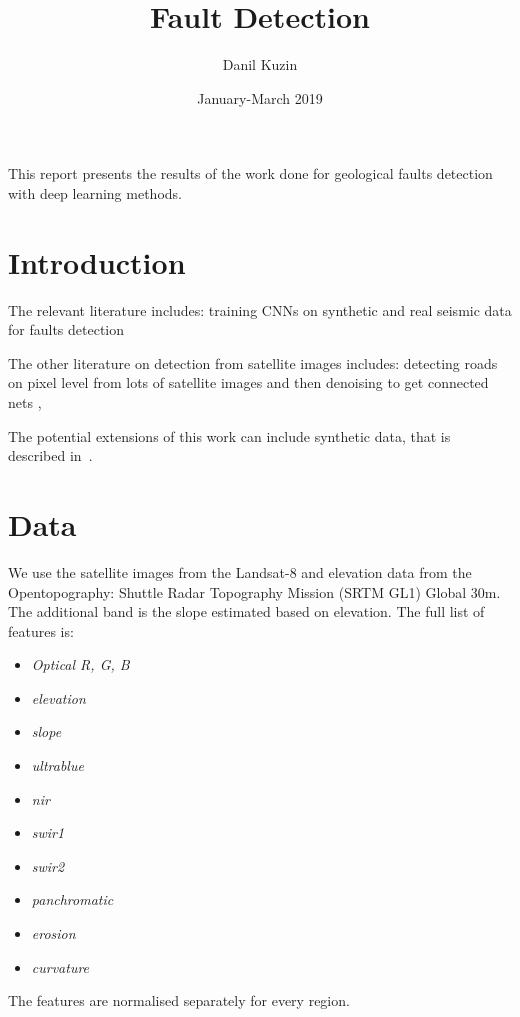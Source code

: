 \documentclass[11pt,a4paper]{article}
\begin{document}
\title{Fault Detection}
\author{Danil Kuzin}
\date{January-March 2019}
\maketitle

\abstract
This report presents the results of the work done for geological faults detection with deep learning methods.



\section{Introduction}

The relevant literature includes: training CNNs on synthetic and real seismic data for faults detection~\cite{pochet2018seismic, araya2017automated, xiong2018seismic, chehrazi2013seismic, lu2018using}

The other literature on detection from satellite images includes: detecting roads on pixel level from lots of satellite images and then denoising to get connected nets \cite{mnih2010learning},

The potential extensions of this work can include synthetic data, that is described in~\cite{hale2014}.

\section{Data}

We use the satellite images from the Landsat-8 and elevation data from the Opentopography:  Shuttle Radar Topography Mission (SRTM GL1) Global 30m. The additional band is the slope estimated based on elevation.
The full list of features is:
\begin{itemize}
\item \textit{Optical R, G, B}
\item \textit{elevation}
\item \textit{slope}
\item \textit{ultrablue}
\item \textit{nir}
\item \textit{swir1}
\item \textit{swir2}
\item \textit{panchromatic}
\item \textit{erosion}
\item \textit{curvature}
\end{itemize}
The features are normalised separately for every region.
\end{document}
